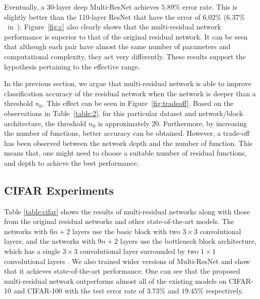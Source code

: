 \documentclass[journal]{IEEEtran}
\begin{document}
\begin{table*}[!htp]
\begin{tabular}{||c c c c|c |c||}
\hline


\end{tabular}
\caption{Comparison of test error rates on CIFAR-10 and CIFAR-100. The results in the form of $median(mean\pm std)$ are based on five runs, while others are based on one run. All results are obtained with a mini-batch size of~128, except $^\dagger$ with a mini-batch size of 64. The number of residual functions in each residual block is denoted as k, and (w) is the widening factor for wider models.}
\label{table:cifar}
\end{table*}



Eventually, a 30-layer deep Multi-ResNet achieves $5.89\%$ error rate. This is slightly better than the 110-layer ResNet that have the error of $6.02\%$ ($6.37\%$~in~\cite{he2016identity}). Figure~\ref{fig:c} also clearly shows that the multi-residual network performance is superior to that of the original residual network. It can be seen that although each pair have almost the same number of parameters and computational complexity, they act very differently. These results support the hypothesis pertaining to the effective range.


In the previous section, we argue that multi-residual network is able to improve classification accuracy of the residual network when the network is deeper than a threshold $n_0$. This effect can be seen in Figure~\ref{fig:tradeoff}. Based on the observations in Table~\ref{table:2}, for this particular dataset and network/block architecture, the threshold $n_0$ is approximately 20. Furthermore, by increasing the number of functions, better accuracy can be obtained. However,  a trade-off has been observed between the network depth and the number of function. This means that, one might need to choose a suitable number of residual functions, and depth to achieve the best performance.


\subsection{CIFAR Experiments}%


Table \ref{table:cifar} shows the results of  multi-residual networks along with those from the original residual networks  and other state-of-the-art models. The networks with $6n+2$ layers use the basic block with two $3\times 3$ convolutional layers, and the networks with $9n+2$ layers use the bottleneck block architecture, which has a single $3\times 3$ convolutional layer surrounded by two $1\times 1$ convolutional layers \cite{he2015deep}. We also trained wider  \cite{zagoruyko2016wide} versions of Multi-ResNet and show that it achieves state-of-the-art performance. One can see that the proposed multi-residual network outperforms almost all of the existing models on CIFAR-10 and CIFAR-100 with the test error rate of $3.73\%$ and $19.45\%$ respectively. 
\end{document}
